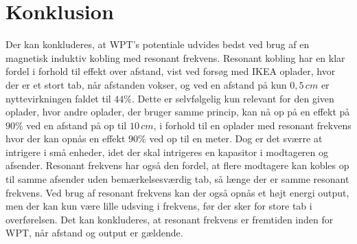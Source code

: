 \chapter{Konklusion}

Der kan konkluderes, at WPT's potentiale udvides bedst ved brug af en magnetisk induktiv kobling med resonant frekvens. Resonant kobling har en klar fordel i forhold til effekt over afstand, vist ved forsøg med IKEA oplader, hvor der er et stort tab, når afstanden vokser, og ved en afstand på kun $0,5 \, cm$ er nyttevirkningen faldet til $44\%$. Dette er selvfølgelig kun relevant for den given oplader, hvor andre oplader, der bruger samme princip, kan nå op på en effekt på $90\%$ ved en afstand på op til $10 \, cm$, i forhold til en oplader med resonant frekvens hvor der kan opnås en effekt $90\%$ ved op til en meter. Dog er det sværre at intrigere i små enheder, idet der skal intrigeres en kapasitor i modtageren og afsender. Resonant frekvens har også den fordel, at flere modtagere kan kobles op til samme afsender uden bemærkelsesværdig tab, så længe der er samme resonant frekvens. Ved brug af resonant frekvens kan der også opnås et højt energi output, men der kan kun være lille udsving i frekvens, før der sker for store tab i overførelsen. Det kan konkluderes, at resonant frekvens er fremtiden inden for WPT, når afstand og output er gældende.
